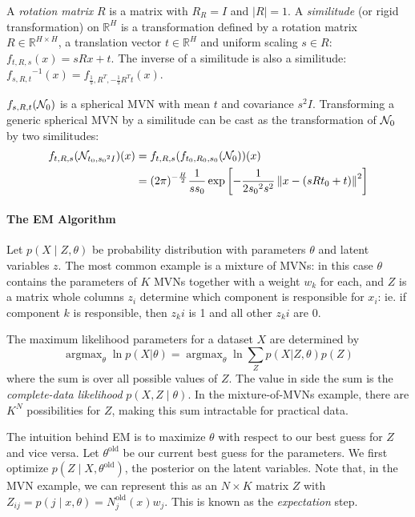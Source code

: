 \documentclass[10pt,a4paper,oneside]{article}
\theoremstyle{definition}
\DeclareMathOperator*{\argmax}{argmax}
\newcommand{\R}{\mathbb{R}}
\newcommand{\cN}{{\cal N}}
\theoremstyle{definition}
\begin{document}
A \emph{rotation matrix} $R$ is a matrix with $R_R = I$ and $|R| = 1$. A \emph{similitude} (or rigid transformation) on $\R^H$ is a transformation defined by a rotation matrix $R \in \R^{H\times H}$, a translation vector $t \in \R^H$ and uniform scaling $s \in R$: $f_{t, R, s}(x) = sRx + t$. 
The inverse of a similitude is also a similitude: ${f_{s, R, t}}^{-1}(x) = f_{\frac{1}{s}, R^T, -\frac{1}{s}R^Tt}(x)$.

$f_{s, R, t}(\cN_0)$ is a spherical MVN with mean $t$ and covariance $s^2I$. Transforming a generic spherical MVN by a similitude can be cast as the transformation of $\cN_0$ by two similitudes:
\begin{align}
f_{t, R, s}(\cN_{t_0, {s_0}^2 I})(x) &= f_{t, R, s}(f_{t_0, R_0, s_0}(\cN_0))(x) \notag \\
&=  (2\pi)^{-\frac{H}{2}} \frac{1}{ss_0} \exp \left[- \frac{1}{2{s_0}^2s^2}\left\| x - (s R t_0 + t)\right \|^2\right] \label{line:inverse}
\end{align}
\paragraph{The EM Algorithm} \cite{dempster1977maximum}
Let $p(X\mid Z, \theta)$ be probability distribution with parameters $\theta$ and latent variables $z$. The most common example is a mixture of MVNs: in this case $\theta$ contains the parameters of $K$ MVNs together with a weight $w_k$ for each, and $Z$ is a matrix whole columns $z_i$ determine which component is responsible for $x_i$: ie. if component $k$ is responsible, then $z_ki$ is 1 and all other $z_ki$ are 0.

The maximum likelihood parameters for a dataset $X$ are determined by 
\[
\argmax_{\theta} \ln p(X|\theta) = \argmax_{\theta} \ln \sum_Z p(X|Z, \theta)p(Z) 
\]
where the sum is over all possible values of $Z$. The value in side the sum is the \emph{complete-data likelihood} $p(X, Z\mid \theta)$. In the mixture-of-MVNs example, there are $K^N$ possibilities for $Z$, making this sum intractable for practical data. 
 
The intuition behind EM is to maximize $\theta$ with respect to our best guess for $Z$ and vice versa. Let $\theta^\text{old}$ be our current best guess for the parameters. We first optimize $p(Z\mid X, \theta^\text{old})$, the posterior on the latent variables. Note that, in the MVN example, we can represent this as an $N\times K$ matrix $Z$ with $Z_{ij} = p(j\mid x,\theta) = N^\text{old}_j(x) w_j$. This is known as the \emph{expectation} step.
\end{document}
